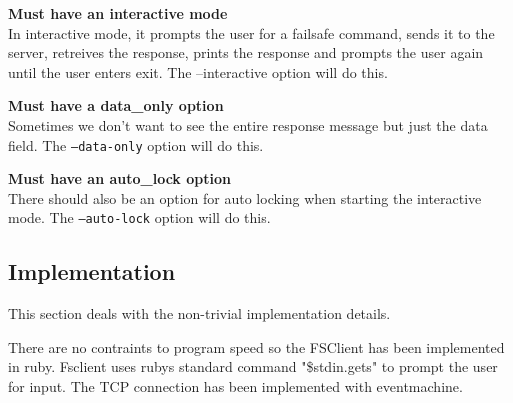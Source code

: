 \textbf{Must have an interactive mode} \\
In interactive mode, it prompts the user for a failsafe command, sends it to the server, retreives the response, prints the response and prompts the user again until the user enters exit. The --interactive option will do this.

\textbf{Must have a data\_only option} \\
Sometimes we don't want to see the entire response message but just the data field. The \texttt{--data-only} option will do this.

\textbf{Must have an auto\_lock option} \\
There should also be an option for auto locking when starting the interactive mode. The \texttt{--auto-lock} option will do this.

\subsection{Implementation}
This section deals with the non-trivial implementation details.

There are no contraints to program speed so the FSClient has been implemented in ruby.
Fsclient uses rubys standard command "\$stdin.gets" to prompt the user for input.
The TCP connection has been implemented with eventmachine.
